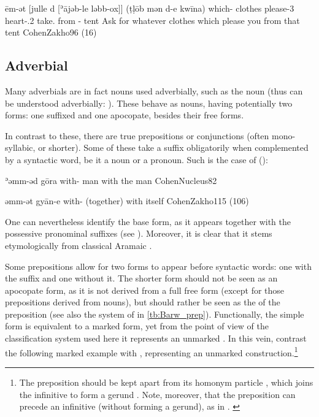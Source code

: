 {ēm-ət [julle d\cb{} [ʾājəb-le ləbb-ox]] (ṭḷōb mən d-e kwīna)}
{which-\cst{} clothes \lnk\cb{} please-3\masc{} heart-\poss.2\masc{} take.\imp{} from \gen- tent}
{Ask for whatever clothes which please you from that tent}
{CohenZakho}{96 (16)}



\subsection{Adverbial \prims} \label{ss:JZax_Adv_head}

Many adverbials are in fact nouns used adverbially, such as the noun   (thus  can be understood adverbially: ). These behave as nouns, having  potentially two \cst* forms: one suffixed and one apocopate, besides their free forms.  



In contrast to these, there are true prepositions or conjunctions (often mono-syllabic, or shorter). Some of these  take a \cst* suffix obligatorily when complemented by a syntactic word, be it a noun or a pronoun. Such is the case of  (): 


{ʾəmm-əd gōra}
{with-\cst{} man}
{with the man}
{CohenNucleus}{82}


 {əmm-ət gyān-e}
 {with-\cst{} \masc}
 {(together) with itself}
 {CohenZakho}{115 (106)}
 
 One can nevertheless identify the base form, as it  appears together with the possessive pronominal suffixes (see ). 
 Moreover, it is clear that it stems etymologically from classical Aramaic  \citep[97a]{SabarDictionary}.
 
Some prepositions allow for two forms to appear before syntactic words: one with the suffix \ed and one without it. The shorter form should not be seen as an apocopate form, as it is not derived from a full free form (except for those prepositions derived from nouns), but should rather be seen as the  of the preposition (see also the system of \Barw in \vref{tb:Barw_prep}). Functionally, the simple form is equivalent to a \cst* marked form, yet from the point of view of the classification system used here it represents an unmarked \prim.  In this vein, contrast the following \cst* marked example with , representing an unmarked  construction.\footnote{The preposition  should be kept apart from its homonym  particle  , which joins the infinitive to form a gerund  \parencites[99, fn. 9]{CohenZakho}[103a]{SabarDictionary}. Note, moreover, that  the preposition  can precede an infinitive (without forming a gerund), as in . \label{ft:JZax_gerund}} 





